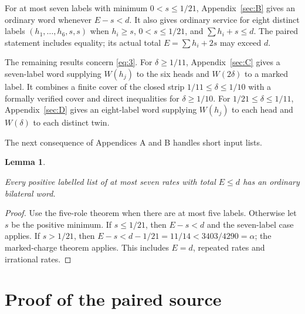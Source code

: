 \documentclass[11pt,a4paper]{article}
\newtheorem{lemma}[theorem]{Lemma}
\begin{document}
For at most seven labels with minimum \(0<s\le1/21\), Appendix~\ref{sec:B} gives an ordinary word whenever \(E-s<d\). It also gives ordinary service for eight distinct labels \((h_1,\ldots,h_6,s,s)\) when \(h_i\ge s\), \(0<s\le1/21\), and \(\sum h_i+s\le d\). The paired statement includes equality; its actual total \(E=\sum h_i+2s\) may exceed \(d\).

The remaining results concern \eqref{eq:3}. For \(\delta\ge1/11\), Appendix~\ref{sec:C} gives a seven-label word supplying \(W(h_j)\) to the six heads and \(W(2\delta)\) to a marked label. It combines a finite cover of the closed strip \(1/11\le\delta\le1/10\) with a formally verified cover and direct inequalities for \(\delta\ge1/10\). For \(1/21\le\delta\le1/11\), Appendix~\ref{sec:D} gives an eight-label word supplying \(W(h_j)\) to each head and \(W(\delta)\) to each distinct twin.

The next consequence of Appendices A and B handles short input lists.

\begin{lemma}\label{stmt:4}

 Every positive labelled list of at most seven rates with total \(E\le d\) has an ordinary bilateral word.

\end{lemma}

\begin{proof}

 Use the five-role theorem when there are at most five labels. Otherwise let \(s\) be the positive minimum. If \(s\le1/21\), then \(E-s<d\) and the seven-label case applies. If \(s>1/21\), then \(E-s<d-1/21=11/14<3403/4290=\alpha\); the marked-charge theorem applies. This includes \(E=d\), repeated rates and irrational rates. 

\end{proof}

\section{Proof of the paired source}\label{sec:3}
\end{document}
